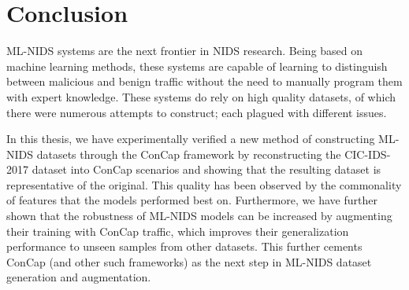 \section{Conclusion}

ML-NIDS systems are the next frontier in NIDS research. Being based on machine learning methods, these systems are capable of learning to distinguish between malicious and benign traffic without the need to manually program them with expert knowledge. These systems do rely on high quality datasets, of which there were numerous attempts to construct; each plagued with different issues. 

In this thesis, we have experimentally verified a new method of constructing ML-NIDS datasets through the ConCap framework by reconstructing the CIC-IDS-2017 dataset into ConCap scenarios and showing that the resulting dataset is representative of the original. This quality has been observed by the commonality of features that the models performed best on. Furthermore, we have further shown that the robustness of ML-NIDS models can be increased by augmenting their training with ConCap traffic, which improves their generalization performance to unseen samples from other datasets. This further cements ConCap (and other such frameworks) as the next step in ML-NIDS dataset generation and augmentation. 